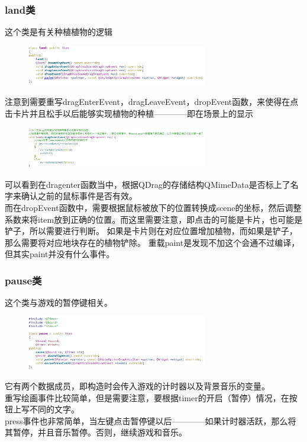 \documentclass[12pt,a4paper,UTF8]{article}
\begin{document}
    \subsubsection{land类}
    这个类是有关种植植物的逻辑
    \begin{figure}[H]
      \centering
    \includegraphics[width=0.7\textwidth]{figure/land.png}
    \end{figure}
    注意到需要重写dragEnterEvent，dragLeaveEvent，dropEvent函数，来使得在点击卡片并且松手以后能够实现植物的种植————即在场景上的显示
    \begin{figure}[H]
      \centering
    \includegraphics[width=0.7\textwidth]{figure/dragenter.png}
    \end{figure}
    可以看到在dragenter函数当中，根据QDrag的存储结构QMimeData是否标上了名字来确认之前的鼠标事件是否有效。\\
    而在dropEvent函数中，需要根据鼠标被放下的位置转换成scene的坐标，然后调整系数来将item放到正确的位置。而这里需要注意，即点击的可能是卡片，也可能是铲子，所以需要进行判断。
    如果是卡片则在对应位置增加植物，而如果是铲子，那么需要将对应地块存在的植物铲除。
    重载paint是发现不加这个会通不过编译，但其实paint并没有什么事件。

    \subsubsection{pause类}
    这个类与游戏的暂停键相关。
    \begin{figure}[H]
      \centering
    \includegraphics[width=0.7\textwidth]{figure/pause.png}
    \end{figure}
    它有两个数据成员，即构造时会传入游戏的计时器以及背景音乐的变量。\\
    重写绘画事件比较简单，但是需要注意，要根据timer的开启（暂停）情况，在按钮上写不同的文字。\\
    press事件也非常简单，当左键点击暂停键以后————如果计时器活跃，那么将其暂停，并且音乐暂停。否则，继续游戏和音乐。
\end{document}
